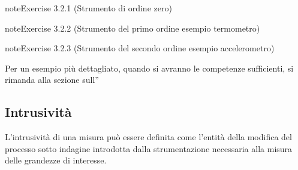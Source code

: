 \documentclass[letterpaper,10pt,italian]{jupyterBook}
\begin{document}
\begin{sphinxadmonition}{note}{Exercise 3.2.1 (Strumento di ordine zero)}



\sphinxAtStartPar
{}
\end{sphinxadmonition}
 \label{exercise:instrument-order-one-exercise}

\begin{sphinxadmonition}{note}{Exercise 3.2.2 (Strumento del primo ordine \sphinxhyphen{} esempio termometro)}



\sphinxAtStartPar
{}
\end{sphinxadmonition}
 \label{exercise:instrument-order-two-exercise}

\begin{sphinxadmonition}{note}{Exercise 3.2.3 (Strumento del secondo ordine \sphinxhyphen{} esempio accelerometro)}



\sphinxAtStartPar
{}

\sphinxAtStartPar
Per un esempio più dettagliato, quando si avranno le competenze sufficienti, si rimanda alla sezione sull”{\hyperref[\detokenize{ch/electromagnetism/electrical-engineering-instruments:physics-hs-electromagnetism-instruments-accelerometer-mems}]{}}
\end{sphinxadmonition}


\subsection{Intrusività}
\label{\detokenize{ch/intro/measurements:intrusivita}}\label{\detokenize{ch/intro/measurements:physics-hs-intro-measurements-instruments-intrusivity}}
\sphinxAtStartPar
L’intrusività di una misura può essere definita come l’entità della modifica del processo sotto indagine introdotta dalla strumentazione necessaria alla misura delle grandezze di interesse.
\end{document}
